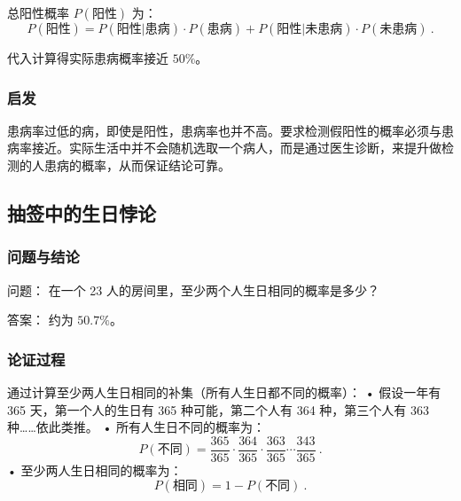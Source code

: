 总阳性概率 $P(\text{阳性})$ 为：
$$
P(\text{阳性}) = P(\text{阳性}|\text{患病}) \cdot P(\text{患病}) + P(\text{阳性}|\text{未患病}) \cdot P(\text{未患病})~.
$$

代入计算得实际患病概率接近 $50\%$。

\subsubsection{启发}

患病率过低的病，即使是阳性，患病率也并不高。要求检测假阳性的概率必须与患病率接近。实际生活中并不会随机选取一个病人，而是通过医生诊断，来提升做检测的人患病的概率，从而保证结论可靠。

\subsection{抽签中的生日悖论}

\subsubsection{问题与结论}

问题：
在一个 23 人的房间里，至少两个人生日相同的概率是多少？

答案：
约为 $50.7\%$。

\subsubsection{论证过程}

通过计算至少两人生日相同的补集（所有人生日都不同的概率）：
	•	假设一年有 365 天，第一个人的生日有 365 种可能，第二个人有 364 种，第三个人有 363 种……依此类推。
	•	所有人生日不同的概率为：
$$
P(\text{不同}) = \frac{365}{365} \cdot \frac{364}{365} \cdot \frac{363}{365} \cdots \frac{343}{365}~.
$$
	•	至少两人生日相同的概率为：
$$
P(\text{相同}) = 1 - P(\text{不同})~.
$$